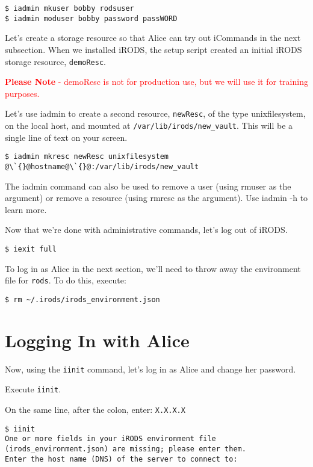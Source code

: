 \documentclass[10pt,oneside]{memoir}
\begin{document}
\begin{lstlisting}
$ iadmin mkuser bobby rodsuser
$ iadmin moduser bobby password passWORD
\end{lstlisting}

Let's create a storage resource so that Alice can try out iCommands in the next subsection. When we installed iRODS, the setup script created an initial iRODS storage resource, \texttt{demoResc}.

\textcolor{red}{\textbf{Please Note} - demoResc is not for production use, but we will use it for training purposes.}

Let's use iadmin to create a second resource, \texttt{newResc}, of the type unixfilesystem, on the local host, and mounted at \texttt{/var/lib/irods/new\_vault}. This will be a single line of text on your screen.

\begin{lstlisting}[basicstyle=\ttfamily]
$ iadmin mkresc newResc unixfilesystem @\`{}@hostname@\`{}@:/var/lib/irods/new_vault
\end{lstlisting}

The iadmin command can also be used to remove a user (using rmuser as the argument) or remove a resource (using rmresc as the argument). Use iadmin -h to learn more.

Now that we're done with administrative commands, let's log out of iRODS.

\begin{lstlisting}
$ iexit full
\end{lstlisting}

To log in as Alice in the next section, we'll need to throw away the environment file for \texttt{rods}. To do this, execute:

\begin{lstlisting}
$ rm ~/.irods/irods_environment.json
\end{lstlisting}

\section{Logging In with Alice}
\label{sec:logging_in_with_alice}

Now, using the \texttt{iinit} command, let's log in as Alice and change her password.

Execute \texttt{iinit}.

On the same line, after the colon, enter: \texttt{X.X.X.X}

\begin{lstlisting}[basicstyle=\scriptsize\ttfamily]
$ iinit
One or more fields in your iRODS environment file (irods_environment.json) are missing; please enter them.
Enter the host name (DNS) of the server to connect to:
\end{lstlisting}
\end{document}

